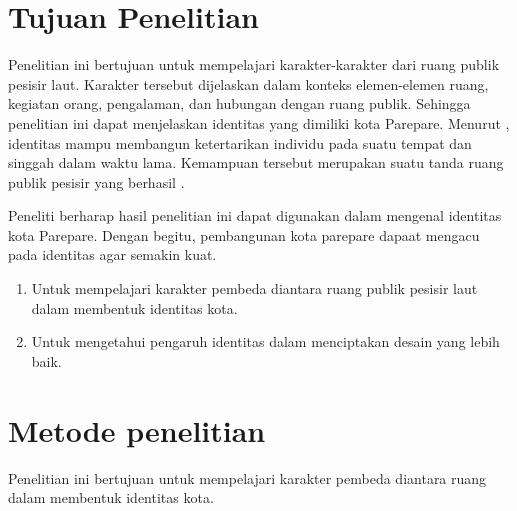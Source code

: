 \documentclass[12pt]{simart} %
\begin{document}
\section{Tujuan Penelitian}
Penelitian ini bertujuan untuk mempelajari karakter-karakter dari ruang publik pesisir laut. Karakter tersebut dijelaskan dalam konteks elemen-elemen ruang, kegiatan orang, pengalaman, dan hubungan dengan ruang publik. Sehingga penelitian ini dapat menjelaskan identitas yang dimiliki kota Parepare. Menurut \cite{oktay2002}, identitas mampu membangun ketertarikan individu pada suatu tempat dan singgah dalam waktu lama. Kemampuan tersebut merupakan suatu tanda ruang publik pesisir yang berhasil \citep{hussein2014}.

Peneliti berharap hasil penelitian ini dapat digunakan dalam mengenal identitas kota Parepare.
Dengan begitu, pembangunan kota parepare dapaat mengacu pada identitas agar semakin kuat.

\begin{enumerate}
    \item Untuk mempelajari karakter pembeda diantara ruang publik pesisir laut dalam membentuk identitas kota.
    \item Untuk mengetahui pengaruh identitas dalam menciptakan desain yang lebih baik.
\end{enumerate}

\section{Metode penelitian}
Penelitian ini bertujuan untuk mempelajari karakter pembeda diantara ruang dalam membentuk identitas kota.
\end{document}
